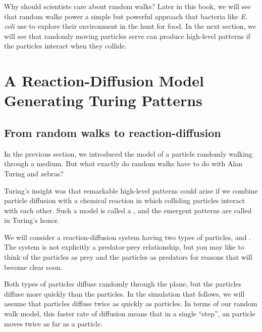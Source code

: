 
Why should scientists care about random walks? Later in this book, we will see that random walks power a simple but powerful approach that bacteria like \textit{E. coli} use to explore their environment in the hunt for food. In the next section, we will see that randomly moving particles serve can produce high-level patterns if the particles interact when they collide.\\

\FloatBarrier
{}

\section{A Reaction-Diffusion Model Generating Turing Patterns}
\label{sec:a_reaction-diffusion_model_generating_turing_patterns}

\subsection{From random walks to reaction-diffusion}

In the previous section, we introduced the model of a particle randomly walking through a medium. But what exactly do random walks have to do with Alan Turing and zebras?

Turing's insight was that remarkable high-level patterns could arise if we combine particle diffusion with a chemical reaction in which colliding particles interact with each other. Such a model is called a , and the emergent patterns are called  in Turing's honor.

We will consider a reaction-diffusion system having two types of particles,  and . The system is not explicitly a predator-prey relationship, but you may like to think of the  particles as prey and the  particles as predators for reasons that will become clear soon.

Both types of particles diffuse randomly through the plane, but the  particles diffuse more quickly than the  particles.  In the simulation that follows, we will assume that  particles diffuse twice as quickly as  particles. In terms of our random walk model, this faster rate of diffusion means that in a single ``step'', an  particle moves twice as far as a  particle.\\

